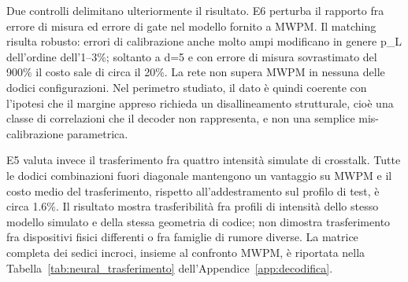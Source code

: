 Due controlli delimitano ulteriormente il risultato. E6 perturba il rapporto fra errore di misura ed errore di gate nel modello fornito a MWPM. Il matching risulta robusto: errori di calibrazione anche molto ampi modificano in genere p\_L dell'ordine dell'1--3\%; soltanto a d=5 e con errore di misura sovrastimato del 900\% il costo sale di circa il 20\%. La rete non supera MWPM in nessuna delle dodici configurazioni. Nel perimetro studiato, il dato è quindi coerente con l'ipotesi che il margine appreso richieda un disallineamento strutturale, cioè una classe di correlazioni che il decoder non rappresenta, e non una semplice mis-calibrazione parametrica.

E5 valuta invece il trasferimento fra quattro intensità simulate di crosstalk. Tutte le dodici combinazioni fuori diagonale mantengono un vantaggio su MWPM e il costo medio del trasferimento, rispetto all'addestramento sul profilo di test, è circa 1.6\%. Il risultato mostra trasferibilità fra profili di intensità dello stesso modello simulato e della stessa geometria di codice; non dimostra trasferimento fra dispositivi fisici differenti o fra famiglie di rumore diverse. La matrice completa dei sedici incroci, insieme al confronto MWPM, è riportata nella Tabella~\ref{tab:neural_trasferimento} dell'Appendice~\ref{app:decodifica}.

